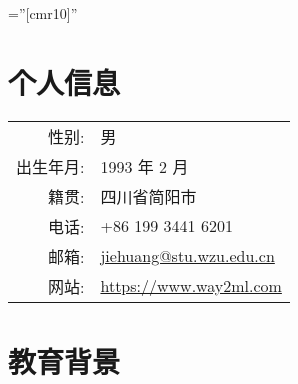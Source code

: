 \documentclass[a4paper,10pt]{article} %
\begin{document}
\font\fb=''[cmr10]'' %

\par{\bigskip\par} %

\section{个人信息}

\begin{tabular}{rl}
\textsc{性别:}                  	& 男 \\
\textsc{出生年月:} 	        & 1993 年 2 月  \\
\textsc{籍贯:} 					& 四川省简阳市  \\
\textsc{电话:} 					& +86 199 3441 6201\\
\textsc{邮箱:} 					& \href{mailto:jiehuang@stu.wzu.edu.cn}{jiehuang@stu.wzu.edu.cn} \\
\textsc{网站:}                   & \href{https://www.way2ml.com}{https://www.way2ml.com}\\
\end{tabular}



\section{教育背景}
\end{document}
